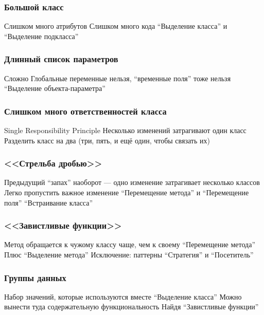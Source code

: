 \documentclass{../../slides-style}
\begin{document}
    \begin{frame}
        \frametitle{Большой класс}
        \begin{outline}
            \1 Слишком много атрибутов
            \1 Слишком много кода
            \1 ``Выделение класса'' и ``Выделение подкласса''
        \end{outline}
    \end{frame}

    \begin{frame}
        \frametitle{Длинный список параметров}
        \begin{outline}
            \1 Сложно
            \1 Глобальные переменные нельзя, ``временные поля'' тоже нельзя
            \1 ``Выделение объекта-параметра''
        \end{outline}
    \end{frame}

    \begin{frame}
        \frametitle{Слишком много ответственностей класса}
        \begin{outline}
            \1 Single Responsibility Principle
            \1 Несколько изменений затрагивают один класс
            \1 Разделить класс на два (три, пять, и ещё один, чтобы связать их)
        \end{outline}
    \end{frame}

    \begin{frame}
        \frametitle{<<Стрельба дробью>>}
        \begin{outline}
            \1 Предыдущий ``запах'' наоборот --- одно изменение затрагивает несколько классов
                \2 Легко пропустить важное изменение
            \1 ``Перемещение метода'' и ``Перемещение поля''
            \1 ``Встраивание класса''
        \end{outline}
    \end{frame}

    \begin{frame}
        \frametitle{<<Завистливые функции>>}
        \begin{outline}
            \1 Метод обращается к чужому классу чаще, чем к своему
            \1 ``Перемещение метода''
                \2 Плюс ``Выделение метода''
            \1 Исключение: паттерны ``Стратегия'' и ``Посетитель''
        \end{outline}
    \end{frame}

    \begin{frame}
        \frametitle{Группы данных}
        \begin{outline}
            \1 Набор значений, которые используются вместе
            \1 ``Выделение класса''
                \2 Можно вынести туда содержательную функциональность
                    \3 Найдя ``Завистливые функции''
        \end{outline}
    \end{frame}
\end{document}
